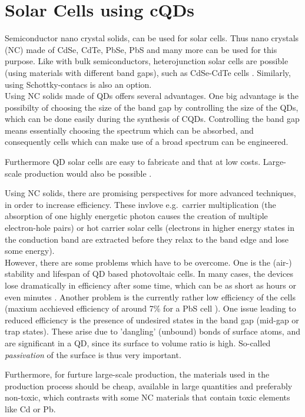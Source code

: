 \section{Solar Cells using cQDs}

Semiconductor nano crystal solids, can be used for solar cells. Thus nano crystals (NC) made of CdSe, CdTe, PbSe, PbS and many more can be used for this purpose. Like with bulk semiconductors, heterojunction solar cells are possible (using materials with different band gaps), such as CdSe-CdTe cells \cite[p.430]{ChemRev}. Similarly, using Schottky-contacs is also an option.\\

Using NC solids made of QDs offers several advantages. One big advantage is the possibilty of choosing the size of the band gap by controlling the size of the QDs, which can be done easily during the synthesis of CQDs. Controlling the band gap means essentially choosing the spectrum which can be absorbed, and consequently cells which can make use of a broad spectrum can be engineered.

Furthermore QD solar cells are easy to fabricate and that at low costs. Large-scale production would also be possible \cite[p.447]{ChemRev}.

Using NC solids, there are promising perspectives for more advanced techniques, in order to increase efficiency. These invlove e.g.~carrier multiplication (the absorption of one highly energetic photon causes the creation of multiple electron-hole pairs) or hot carrier solar cells (electrons in higher energy states in the conduction band are extracted before they relax to the band edge and lose some energy).\\

However, there are some problems which have to be overcome. One is the (air-) stability and lifespan of QD based photovoltaic cells. In many cases, the devices lose dramatically in efficiency after some time, which can be as short as hours or even minutes \cite[p.26]{Tang2011}. Another problem is the currently rather low efficiency of the cells (maxium acchieved efficiency of around 7\% for a PbS cell \cite[p.1]{Ip2012}). One issue leading to reduced efficiency is the presence of undesired states in the band gap (mid-gap or trap states). These arise due to 'dangling' (unbound) bonds of surface atoms, and are significant in a QD, since its surface to volume ratio is high. So-called \textit{passivation} of the surface is thus very important. 

Furthermore, for furture large-scale production, the materials used in the production process should be cheap,  available in large quantities and preferably non-toxic, which contrasts with some NC materials that contain toxic elements like Cd or Pb.

